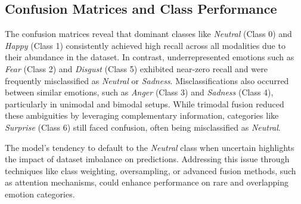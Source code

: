 \subsection{Confusion Matrices and Class Performance}
The confusion matrices reveal that dominant classes like \textit{Neutral} (Class 0) and \textit{Happy} (Class 1) consistently achieved high recall across all modalities due to their abundance in the dataset. In contrast, underrepresented emotions such as \textit{Fear} (Class 2) and \textit{Disgust} (Class 5) exhibited near-zero recall and were frequently misclassified as \textit{Neutral} or \textit{Sadness}. Misclassifications also occurred between similar emotions, such as \textit{Anger} (Class 3) and \textit{Sadness} (Class 4), particularly in unimodal and bimodal setups. While trimodal fusion reduced these ambiguities by leveraging complementary information, categories like \textit{Surprise} (Class 6) still faced confusion, often being misclassified as \textit{Neutral}.

The model's tendency to default to the \textit{Neutral} class when uncertain highlights the impact of dataset imbalance on predictions. Addressing this issue through techniques like class weighting, oversampling, or advanced fusion methods, such as attention mechanisms, could enhance performance on rare and overlapping emotion categories.
